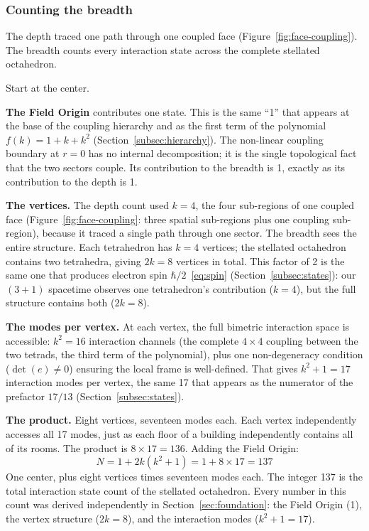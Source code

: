 \documentclass[aps,prd,preprint,superscriptaddress,showpacs,preprintnumbers,amsmath,amssymb,nofootinbib]{revtex4-2}
\begin{document}
\subsubsection*{Counting the breadth}

The depth traced one path through one coupled face (Figure~\ref{fig:face-coupling}). The breadth counts every interaction state across the complete stellated octahedron.

Start at the center.

\textbf{The Field Origin} contributes one state. This is the same ``1'' that appears at the base of the coupling hierarchy and as the first term of the polynomial $f(k) = 1 + k + k^2$ (Section~\ref{subsec:hierarchy}). The non-linear coupling boundary at $r = 0$ has no internal decomposition; it is the single topological fact that the two sectors couple. Its contribution to the breadth is 1, exactly as its contribution to the depth is 1.

\textbf{The vertices.} The depth count used $k = 4$, the four sub-regions of one coupled face (Figure~\ref{fig:face-coupling}: three spatial sub-regions plus one coupling sub-region), because it traced a single path through one sector. The breadth sees the entire structure. Each tetrahedron has $k = 4$ vertices; the stellated octahedron contains two tetrahedra, giving $2k = 8$ vertices in total. This factor of 2 is the same one that produces electron spin $\hbar/2$~\eqref{eq:spin} (Section~\ref{subsec:states}): our $(3+1)$ spacetime observes one tetrahedron's contribution ($k = 4$), but the full structure contains both ($2k = 8$).

\textbf{The modes per vertex.} At each vertex, the full bimetric interaction space is accessible: $k^2 = 16$ interaction channels (the complete $4 \times 4$ coupling between the two tetrads, the third term of the polynomial), plus one non-degeneracy condition ($\det(e) \neq 0$) ensuring the local frame is well-defined. That gives $k^2 + 1 = 17$ interaction modes per vertex, the same 17 that appears as the numerator of the prefactor $17/13$ (Section~\ref{subsec:states}).

\textbf{The product.} Eight vertices, seventeen modes each. Each vertex independently accesses all 17 modes, just as each floor of a building independently contains all of its rooms. The product is $8 \times 17 = 136$. Adding the Field Origin:
\begin{equation*}
N = 1 + 2k(k^2 + 1) = 1 + 8 \times 17 = 137
\end{equation*}
One center, plus eight vertices times seventeen modes each. The integer 137 is the total interaction state count of the stellated octahedron. Every number in this count was derived independently in Section~\ref{sec:foundation}: the Field Origin (1), the vertex structure ($2k = 8$), and the interaction modes ($k^2 + 1 = 17$).
\end{document}

